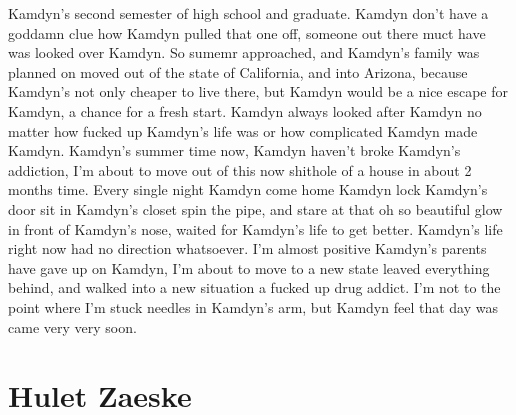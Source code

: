 \documentclass[12pt]{book}
\begin{document}
Kamdyn's second semester of high school and graduate. Kamdyn don't have a goddamn clue how Kamdyn pulled that one off, someone out there muct have was looked over Kamdyn. So sumemr approached, and Kamdyn's family was planned on moved out of the state of California, and into Arizona, because Kamdyn's not only cheaper to live there, but Kamdyn would be a nice escape for Kamdyn, a chance for a fresh start. Kamdyn always looked after Kamdyn no matter how fucked up Kamdyn's life was or how complicated Kamdyn made Kamdyn. Kamdyn's summer time now, Kamdyn haven't broke Kamdyn's addiction, I'm about to move out of this now shithole of a house in about 2 months time. Every single night Kamdyn come home Kamdyn lock Kamdyn's door sit in Kamdyn's closet spin the pipe, and stare at that oh so beautiful glow in front of Kamdyn's nose, waited for Kamdyn's life to get better. Kamdyn's life right now had no direction whatsoever. I'm almost positive Kamdyn's parents have gave up on Kamdyn, I'm about to move to a new state leaved everything behind, and walked into a new situation a fucked up drug addict. I'm not to the point where I'm stuck needles in Kamdyn's arm, but Kamdyn feel that day was came very very soon.






\chapter{Hulet Zaeske}
\end{document}
